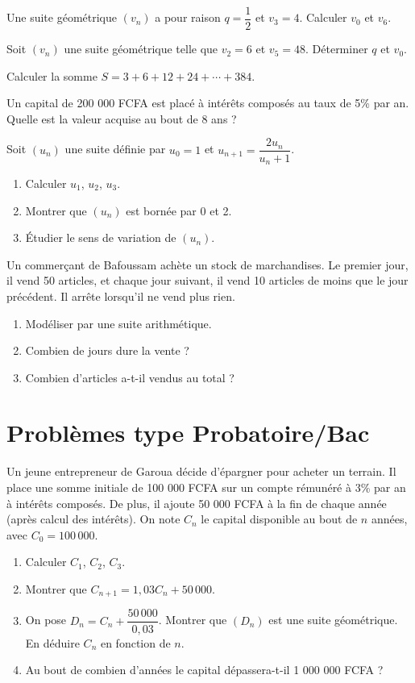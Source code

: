 
\exo{}
Une suite géométrique $(v_n)$ a pour raison $q = \dfrac{1}{2}$ et $v_3 = 4$. Calculer $v_0$ et $v_6$.

\exo{}
Soit $(v_n)$ une suite géométrique telle que $v_2 = 6$ et $v_5 = 48$. Déterminer $q$ et $v_0$.

\exo{}
Calculer la somme $S = 3 + 6 + 12 + 24 + \cdots + 384$.

\exo{}
Un capital de 200 000 FCFA est placé à intérêts composés au taux de 5\% par an. Quelle est la valeur acquise au bout de 8 ans ?


\exo{}
Soit $(u_n)$ une suite définie par $u_0 = 1$ et $u_{n+1} = \dfrac{2u_n}{u_n + 1}$.
\begin{enumerate}[label=\alph*)]
\item Calculer $u_1$, $u_2$, $u_3$.
\item Montrer que $(u_n)$ est bornée par 0 et 2.
\item Étudier le sens de variation de $(u_n)$.
\end{enumerate}

\exo{}
Un commerçant de Bafoussam achète un stock de marchandises. Le premier jour, il vend 50 articles, et chaque jour suivant, il vend 10 articles de moins que le jour précédent. Il arrête lorsqu'il ne vend plus rien.
\begin{enumerate}[label=\alph*)]
\item Modéliser par une suite arithmétique.
\item Combien de jours dure la vente ?
\item Combien d'articles a-t-il vendus au total ?
\end{enumerate}

\section{Problèmes type Probatoire/Bac}

Un jeune entrepreneur de Garoua décide d'épargner pour acheter un terrain. Il place une somme initiale de 100 000 FCFA sur un compte rémunéré à 3\% par an à intérêts composés. De plus, il ajoute 50 000 FCFA à la fin de chaque année (après calcul des intérêts). On note $C_n$ le capital disponible au bout de $n$ années, avec $C_0 = 100\,000$.
\begin{enumerate}[label=\arabic*)]
\item Calculer $C_1$, $C_2$, $C_3$.
\item Montrer que $C_{n+1} = 1,03 C_n + 50\,000$.
\item On pose $D_n = C_n + \dfrac{50\,000}{0,03}$. Montrer que $(D_n)$ est une suite géométrique. En déduire $C_n$ en fonction de $n$.
\item Au bout de combien d'années le capital dépassera-t-il 1 000 000 FCFA ?
\end{enumerate}

